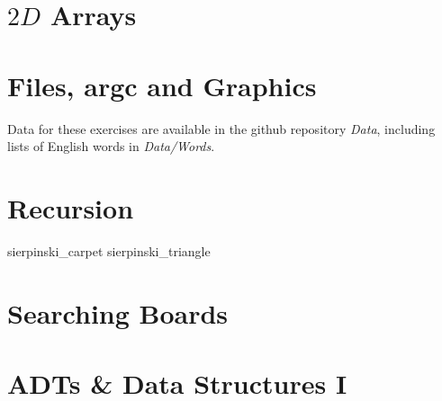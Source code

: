 \chapter{$2D$ Arrays}

\nopartorder










\chapter{Files, argc and Graphics}

Data for these exercises are available in the github repository {\em
Data}, including lists of English words in {\em Data/Words}.










\setcounter{chapter}{6}
\chapter{Recursion}






 {sierpinski_carpet}
 {sierpinski_triangle}

%

\chapter{Searching Boards}












\chapter{ADTs \& Data Structures I}

